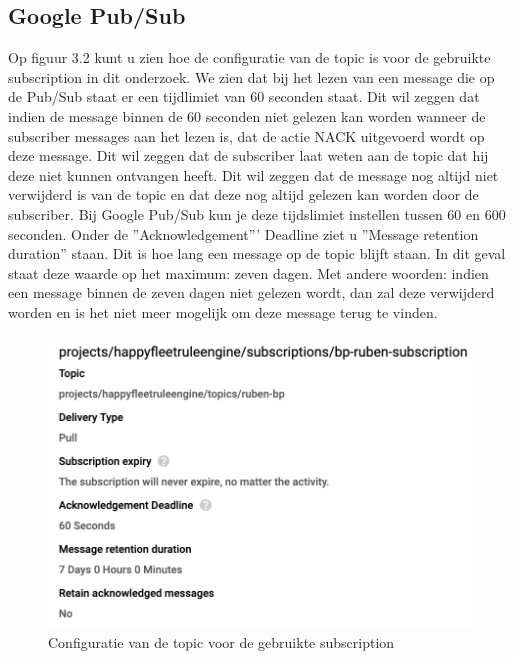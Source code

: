 \subsection{Google Pub/Sub}
Op figuur 3.2 kunt u zien hoe de configuratie van de topic is voor de gebruikte subscription in dit onderzoek. We zien dat bij het lezen van een message die op de Pub/Sub staat er een tijdlimiet van 60 seconden staat. Dit wil zeggen dat indien de message binnen de 60 seconden niet gelezen kan worden wanneer de subscriber messages aan het lezen is, dat de actie NACK uitgevoerd wordt op deze message. Dit wil zeggen dat de subscriber laat weten aan de topic dat hij deze niet kunnen ontvangen heeft. Dit wil zeggen dat de message nog altijd niet verwijderd is van de topic en dat deze nog altijd gelezen kan worden door de subscriber. Bij Google Pub/Sub kun je deze tijdslimiet instellen tussen 60 en 600 seconden. Onder de ''Acknowledgement''' Deadline ziet u ''Message retention duration'' staan. Dit is hoe lang een message op de topic blijft staan. In dit geval staat deze waarde op het maximum: zeven dagen. Met andere woorden: indien een message binnen de zeven dagen niet gelezen wordt, dan zal deze verwijderd worden en is het niet meer mogelijk om deze message terug te vinden.
\begin{figure}[h!]
    \centering
    \includegraphics[width=140mm]{../gpsConfig.png}
    \caption{Configuratie van de topic voor de gebruikte subscription}
    
\end{figure}

